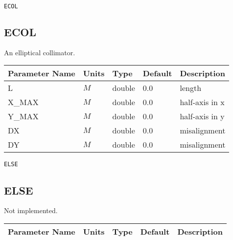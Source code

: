\begin{latexonly}
\newpage
\begin{center}{\Large\verb|ECOL|}\end{center}
\end{latexonly}\subsection{ECOL}
An elliptical collimator.
\\
\begin{tabular}{|l|l|l|l|p{\descwidth}|} \hline
Parameter Name & Units & Type & Default & Description \\ \hline 
L & $M$ & double &  0.0 & length  \\ \hline 
X\_MAX & $M$ & double &  0.0 & half-axis in x  \\ \hline 
Y\_MAX & $M$ & double &  0.0 & half-axis in y  \\ \hline 
DX & $M$ & double &  0.0 & misalignment  \\ \hline 
DY & $M$ & double &  0.0 & misalignment  \\ \hline 
\end{tabular}

\begin{latexonly}
\newpage
\begin{center}{\Large\verb|ELSE|}\end{center}
\end{latexonly}\subsection{ELSE}
Not implemented.
\\
\begin{tabular}{|l|l|l|l|p{\descwidth}|} \hline
Parameter Name & Units & Type & Default & Description \\ \hline 
\end{tabular}

